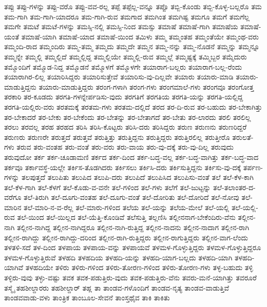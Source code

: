 {ತಪ್ಪು
ತಪ್ಪು-ಗಳನ್ನು
ತಪ್ಪು-ವರೊ
ತಪ್ಪು-ವವ-ರಲ್ಲ
ತಪ್ಪೆ
ತಪ್ಪೆಲ್ಲ-ವನ್ನೂ
ತಪ್ಪೊ
ತಬ್ಬಿ-ಕೊಂಡು
ತಬ್ಬಿ-ಕೊಳ್ಳ-ಬಲ್ಲರೊ
ತಮ
ತಮ-ಗಾಗಿ
ತಮ-ಗಾಗಿ-ಯಾದರೂ
ತಮ-ಗಾಗಿ-ರುವ
ತಮಗಾದ
ತಮಗಿಂತ
ತಮಗಿಷ್ಟ
ತಮಗೂ
ತಮಗೆ
ತಮಗೆಲ್ಲ
ತಮಗೇ
ತಮಟೆ
ತಮಟೆ-ಗಳನ್ನು
ತಮಸ್ಸಿ-ನಲ್ಲಿ
ತಮಸ್ಸಿ-ನಿಂದ
ತಮಸ್ಸು
ತಮಾಷೆ
ತಮಾಷೆ-ಗಾಗಿ
ತಮಾಷೆಯ
ತಮಾಷೆ-ಯಂತೆ
ತಮಾಷೆ-ಯಾಗಿ
ತಮಾಷೆ-ಯಾದ
ತಮಾಷೆ-ಯಿಂದ
ತಮಿಳು
ತಮ್ಮ
ತಮ್ಮಂತಹ
ತಮ್ಮಂತೆಯೇ
ತಮ್ಮಂಥ-ವರು
ತಮ್ಮಂದಿ-ರಾದ
ತಮ್ಮಂದಿರು
ತಮ್ಮ-ತಮ್ಮ
ತಮ್ಮದು
ತಮ್ಮದೇ
ತಮ್ಮನ
ತಮ್ಮ-ನನ್ನು
ತಮ್ಮ-ನೊಡನೆ
ತಮ್ಮನ್ನು
ತಮ್ಮನ್ನೂ
ತಮ್ಮನ್ನೇ
ತಮ್ಮಲ್ಲಿ
ತಮ್ಮಲ್ಲಿದೆ
ತಮ್ಮಲ್ಲಿದ್ದ
ತಮ್ಮಲ್ಲಿಯೇ
ತಮ್ಮಲ್ಲಿ-ರುವ
ತಮ್ಮಲ್ಲೆ
ತಮ್ಮಷ್ಟಕ್ಕೆ
ತಮ್ಮಿಬ್ಬರ
ತಮ್ಮೆದುರು
ತಮ್ಮೊಂದಿಗೆ
ತಮ್ಮೊಡ-ನಿದ್ದ
ತಮ್ಮೊಡನೆ
ತಮ್ಮೊಳಗೆ
ತಮ್ಮೊಳಗೇ
ತಯಾರಾಗ-ಬಲ್ಲರು
ತಯಾರಾಗ-ಬಲ್ಲ-ರೆಂದು
ತಯಾರಾಗಿರ-ಲಿಲ್ಲ
ತಯಾರಿಸಿದ್ದರು
ತಯಾರಿಸುತ್ತೇವೆ
ತಯಾರಿಸು-ವು-ದಿಲ್ಲವೇ
ತಯಾರು
ತಯಾರು-ಮಾಡಿ
ತಯಾರು-ಮಾಡುತ್ತಿದ್ದನು
ತಯಾರು-ಮಾಡುತ್ತಿದ್ದರು
ತರಂಗ-ಗಳಾಗಿ
ತರಂಗ-ಗಳು
ತರಂಗಮಾಲೆ-ಗಳು
ತರಂಗವೂ
ತರಂಗೋತ್ತ
ತರಕಾರಿ
ತರ-ಕೂಡದು
ತರಗತಿ-ಗಳನ್ನೇರ್ಪಡಿಸು-ವುದು
ತರಗತಿಗೆ
ತರಗತಿಯ
ತರಗತಿ-ಯನ್ನು
ತರಗತಿ-ಯಲ್ಲಿದ್ದ
ತರಗತಿ-ಯಲ್ಲಿರು-ವರು
ತರತಮಕ್ಕೆ
ತರತಮ-ಗಳು
ತರತಮ-ದಲ್ಲಿದೆ
ತರದ
ತರ-ದಿ-ರುವ
ತರ-ಬಹುದು
ತರ-ಬೇಕಾಗಿತ್ತು
ತರ-ಬೇಕಾದರೆ
ತರ-ಬೇಕು
ತರ-ಬೇಕೆಂದು
ತರ-ಬೇತನ್ನು
ತರ-ಬೇತಾಗದೆ
ತರ-ಬೇತು
ತರ-ಲಾರದು
ತರಲಿ
ತರಲಿಲ್ಲ
ತರಲು
ತರವಲ್ಲ
ತರಹ
ತರಹದ
ತರಿಸಿ
ತರಿಸಿ-ಕೊಟ್ಟರು
ತರಿಸಿ-ದರು
ತರಿಸಿದ್ದರು
ತರುಣ
ತರುಣನು
ತರುಣರಿದ್ದರೆ
ತರುಣರು
ತರುಣರೇ
ತರುತ್ತದೆ
ತರುತ್ತವೆ
ತರುತ್ತಿತ್ತು
ತರುತ್ತಿದ್ದನು
ತರುತ್ತಿದ್ದರು
ತರುತ್ತಿರಲಿಲ್ಲ
ತರುತ್ತೀರೊ
ತರುಲತೆ-ಗಳು
ತರುವ
ತರು-ವಂತಹ
ತರು-ವಂತೆ
ತರು-ವರು
ತರು-ವಾಯ
ತರು-ವು-ದಕ್ಕೆ
ತರು-ವು-ದಿಲ್ಲ
ತರುವುದು
ತರುವುದೋ
ತರ್ಕ
ತರ್ಕ-ಚೂಡಾಮಣಿ
ತರ್ಕದ
ತರ್ಕ-ದಿಂದ
ತರ್ಕ-ಬದ್ಧ-ವಲ್ಲ
ತರ್ಕ-ಬದ್ಧ-ವಾಗಿತ್ತು
ತರ್ಕ-ಬದ್ಧ-ವಾದ
ತರ್ಕವೂ
ತರ್ಕಾವಸ್ಥೆ-ಯಲ್ಲೇ
ತರ್ಕಿಸ-ತೊಡಗಿದರು
ತರ್ಕಿಸಲು
ತರ್ಕಿಸಿ-ದರು
ತರ್ಕಿಸುತ್ತಿದ್ದನು
ತರ್ಕಿಸು-ವು-ದಕ್ಕೆ
ತರ್ಪಣ-ಗಳನ್ನು
ತಲಪುತ್ತದೆ
ತಲುಪಿತು
ತಲುಪಿದ
ತಲುಪಿ-ದರು
ತಲುಪಿದೆ
ತಲುಪಿಸಿದ
ತಲುಪಿಸು-ವಂತೆ
ತಲೆ
ತಲೆ-ಕೆಳ-ಕಾಗಿ
ತಲೆ-ಕೆಳ-ಗಾಗಿ
ತಲೆ-ಕೆಳಗೆ
ತಲೆ-ಕೊಡು-ವ-ವನೇ
ತಲೆ-ಗಳಿಂದ
ತಲೆ-ಗಳು
ತಲೆಗೆ
ತಲೆ-ಜುಟ್ಟನ್ನು
ತಲೆ-ತಲಾಂತರ-ದ-ವರೆಗೂ
ತಲೆ-ತಿರುಗಿ
ತಲೆ-ದೂಗು-ವಂತಹ
ತಲೆ-ದೂಗು-ವಂತೆ
ತಲೆ-ದೋರಿತು
ತಲೆ-ದೋರಿದೆ
ತಲೆ-ನೋವು
ತಲೆ-ಮಾರಿನ
ತಲೆ-ಮಾರಿ-ನ-ವ-ರೆಲ್ಲ
ತಲೆ-ಮಾರು-ಗಳಿಂದ
ತಲೆಯ
ತಲೆ-ಯನ್ನು
ತಲೆಯ-ಮೇಲೆ
ತಲೆ-ಯಲ್ಲಿ
ತಲೆ-ಯಲ್ಲಿ-ರುವ
ತಲೆ-ಯಿಂದ
ತಲೆ-ಯಿಲ್ಲದ
ತಲೆ-ಯೆತ್ತಿ-ಕೊಂಡಿವೆ
ತಲೆಸುತ್ತಿ
ತಲ್ಲಣಿಸಿ
ತಲ್ಲೀನನಾಗ-ಬೇಕೆಂದಿರು-ವೆನು
ತಲ್ಲೀನ-ನಾಗಿ
ತಲ್ಲೀನ-ನಾಗಿದ್ದ
ತಲ್ಲೀನ-ನಾಗಿದ್ದರೂ
ತಲ್ಲೀನ-ನಾಗಿ-ರುತ್ತಿದ್ದ
ತಲ್ಲೀನ-ನಾದನು
ತಲ್ಲೀನ-ನಾದಾಗ
ತಲ್ಲೀನ-ರಾಗಿ
ತಲ್ಲೀನ-ರಾಗಿದ್ದು
ತಲ್ಲೀನ-ರಾಗಿದ್ದು-ದರಿಂದ
ತಲ್ಲೀನ-ರಾಗಿ-ರುತ್ತಿದ್ದರು
ತಲ್ಲೀನ-ರಾಗುತ್ತಿದ್ದರು
ತಲ್ಲೀನ-ವಾಗ-ಲೆಂದು
ತಳತಳಿ-ಸದೆ
ತಳ-ದಿಂದ
ತಳಪಾಯ
ತಳಪಾಯ-ವನ್ನು
ತಳಪಾಯವೆ
ತಳಮಳ-ಗೊಳ್ಳುತ್ತಿದ್ದರು
ತಳಮಳ-ಗೊಳ್ಳುತ್ತಿದ್ದರೂ
ತಳಮಳ-ಗೊಳ್ಳುತ್ತಿರುವೆ
ತಳಹದಿ
ತಳಹದಿಯ
ತಳಹದಿ-ಯನ್ನು
ತಳಹದಿ-ಯಾಗ-ಬಲ್ಲದು
ತಳಹದಿ-ಯಾಗಿ
ತಳಹದಿ-ಯಾಗಿವೆ
ತಳಹದಿಯೇ
ತಳಿರು
ತಳಿರು-ಗಳಿಂದ
ತಳಿರು-ತೋರಣ-ಗಳಿಂದ
ತಳಿರು-ತೋರಣ-ಗಳು
ತಳ್ಳ-ಬಹುದು
ತಳ್ಳಿ
ತಳ್ಳಿರು-ವುವು
ತಳ್ಳು-ವಷ್ಟು
ತವಕ
ತವಕ-ಪಡುತ್ತಿರು-ವುದು
ತವಕ-ಪಡುತ್ತಿರು-ವೆನು
ತವರು-ಮನೆ-ಯಾಗಿತ್ತು
ತವರೂರೆ
ತಸ್ಮೈ
ತಹಶೀಲ್ದಾರರು
ತಹಶೀಲ್ದಾರ್
ತಹ್ಲ
ತಾ
ತಾಂಡವ-ಗಳೊಂದಿಗೆ
ತಾಂಡವ-ನೃತ್ಯ
ತಾಂಡವ-ವಾಡುತ್ತಿವೆ
ತಾಂಡವವಾಡು-ವಳು
ತಾಂತ್ರಿಕ
ತಾಂಬೂಲ-ಸೇವನೆ
ತಾಂಸ್ತಥೈವ
ತಾಕಿ
ತಾಕಿತು
}
